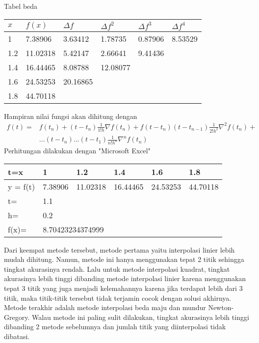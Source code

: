 \documentclass[12pt]{article}
\begin{document}
\begin{enumerate}
{        Tabel beda
        \begin{longtable}[c]{|l|l|l|l|l|l|}
            \hline
            $x$ & $f(x)$ & {$\Delta f$} & {$\Delta f^2$} & {$\Delta f^3$} & {$\Delta f^4$} \\ \hline
            1   & 7.38906  & 3.63412  & 1.78735  & 0.87906 & 8.53529 \\ \hline
            1.2 & 11.02318 & 5.42147  & 2.66641  & 9.41436 &         \\ \hline
            1.4 & 16.44465 & 8.08788  & 12.08077 &         &         \\ \hline
            1.6 & 24.53253 & 20.16865 &          &         &         \\ \hline
            1.8 & 44.70118 &          &          &         &         \\ \hline
        \end{longtable}
        Hampiran nilai fungsi akan dihitung dengan
        \begin{align*}
            f(t) = & f(t_n) + (t - t_n)\frac{1}{1!h}\nabla f(t_n) + f(t - t_n)(t - t_{n-1})\frac{1}{2!h^2} \nabla^2 f(t_n) + \\ & ... (t - t_n)...(t - t_1)\frac{1}{n!h^n}\nabla^nf(t_n)
        \end{align*}
        Perhitungan dilakukan dengan "Microsoft Excel"
        \begin{longtable}[c]{|l|lllll|}
            \hline
            t=x      & \multicolumn{1}{l|}{1}       & \multicolumn{1}{l|}{1.2}      & \multicolumn{1}{l|}{1.4}      & \multicolumn{1}{l|}{1.6}      & 1.8      \\ \hline
            \endfirsthead
            \endhead
            y = f(t) & \multicolumn{1}{l|}{7.38906} & \multicolumn{1}{l|}{11.02318} & \multicolumn{1}{l|}{16.44465} & \multicolumn{1}{l|}{24.53253} & 44.70118 \\ \hline
            t=    & \multicolumn{5}{l|}{1.1}              \\ \hline
            h=    & \multicolumn{5}{l|}{0.2}              \\ \hline
            f(x)= & \multicolumn{5}{l|}{8.70423234374999} \\ \hline
        \end{longtable}
    }
\end{enumerate}
\qquad Dari keempat metode tersebut, metode pertama yaitu interpolasi linier lebih mudah dihitung. Namun, metode ini hanya menggunakan tepat 2 titik sehingga tingkat akurasinya rendah. Lalu untuk metode interpolasi kuadrat, tingkat akurasinya lebih tinggi dibanding metode interpolasi linier karena menggunakan tepat 3 titik yang juga menjadi kelemahannya karena jika terdapat lebih dari 3 titik, maka titik-titik tersebut tidak terjamin cocok dengan solusi akhirnya. Metode terakhir adalah metode interpolasi beda maju dan mundur Newton-Gregory. Walau metode ini paling sulit dilakukan, tingkat akurasinya lebih tinggi dibanding 2 metode sebelumnya dan jumlah titik yang diinterpolasi tidak dibatasi.
\end{document}
